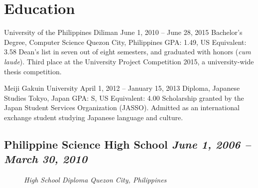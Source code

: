 \section*{Education}

\academe
	{University of the Philippines Diliman}
	{June 1, 2010 -- June 28, 2015}
	{Bachelor's Degree, Computer Science}
	{Quezon City, Philippines}
	{GPA: 1.49, US Equivalent: 3.58}
	{Dean's list in seven out of eight semesters, and graduated with honors (\emph{cum laude}).}
	{Third place at the University Project Competition 2015, a university-wide thesis competition.}

\academe
	{Meiji Gakuin University}
	{April 1, 2012 -- January 15, 2013}
	{Diploma, Japanese Studies}
	{Tokyo, Japan}
	{GPA: S, US Equivalent: 4.00}
	{Scholarship granted by the Japan Student Services Organization (JASSO).}
	{Admitted as an international exchange student studying Japanese language and culture.}

\subsection*{{\color{special-color}Philippine Science High School \hfill \textnormal{\emph{June 1, 2006 -- March 30, 2010}}}}
\begin{description}
	\item[\faGraduationCap]\emph{High School Diploma \hfill {\color{gray}Quezon City, Philippines}}
\end{description}